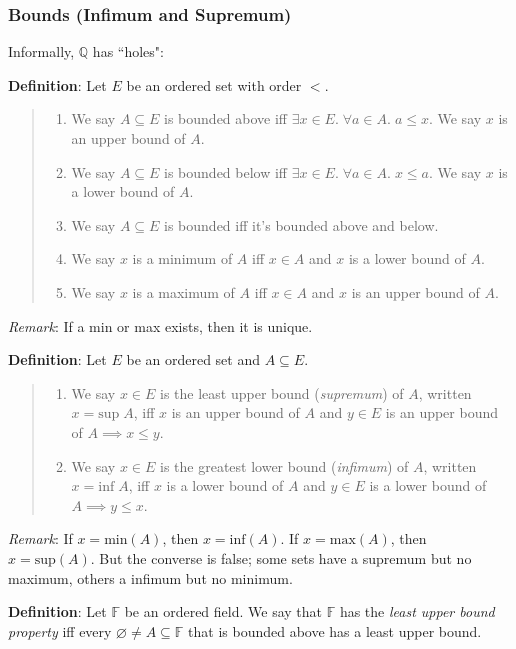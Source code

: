 \documentclass[11pt]{article}
\begin{document}
\subsubsection{Bounds (Infimum and Supremum)}

Informally, $\mathbb{Q}$ has ``holes":

\textbf{Definition}: Let $E$ be an ordered set with order $<$.
\begin{quote}\vspace{-0.3cm}
	\begin{enumerate}
	\item We say $A \subseteq E$ is bounded above iff $\exists x \in E.\; \forall a \in A.\; a \leq x$. We say $x$ is an upper bound of $A$.
	\item We say $A \subseteq E$ is bounded below iff $\exists x \in E.\; \forall a \in A.\; x \leq a$. We say $x$ is a lower bound of $A$.
	\item We say $A \subseteq E$ is bounded iff it's bounded above and below.
	\item We say $x$ is a minimum of $A$ iff $x \in A$ and $x$ is a lower bound of $A$.
	\item We say $x$ is a maximum of $A$ iff $x \in A$ and $x$ is an upper bound of $A$.
	\end{enumerate}
\end{quote}
\emph{Remark}: If a min or max exists, then it is unique.

\textbf{Definition}: Let $E$ be an ordered set and $A \subseteq E$.
\begin{quote}\vspace{-0.3cm}
	\begin{enumerate}
	\item We say $x \in E$ is the least upper bound (\emph{supremum}) of $A$, written $x = \text{sup}\; A$, iff $x$ is an upper bound of $A$ and $y \in E$ is an upper bound of $A \implies x \leq y$.
	\item We say $x \in E$ is the greatest lower bound (\emph{infimum}) of $A$, written $x = \text{inf}\; A$, iff $x$ is a lower bound of $A$ and $y \in E$ is a lower bound of $A \implies y \leq x$.
	\end{enumerate}
\end{quote}
\emph{Remark}: If $x = \text{min}(A)$, then $x = \text{inf}(A)$. If $x = \text{max}(A)$, then $x = \text{sup}(A)$. But the converse is false; some sets have a supremum but no maximum, others a infimum but no minimum.

\textbf{Definition}: Let $\mathbb{F}$ be an ordered field. We say that $\mathbb{F}$ has the \emph{least upper bound property} iff every $\varnothing \neq A \subseteq \mathbb{F}$ that is bounded above has a least upper bound.
\end{document}
